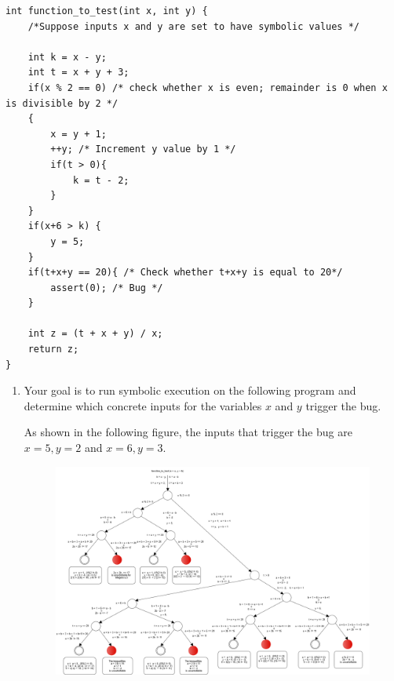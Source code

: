 \documentclass[12pt,a4paper]{article}
\begin{document}
\begin{enumerate}

\begin{lstlisting} 
int function_to_test(int x, int y) {
	/*Suppose inputs x and y are set to have symbolic values */
	
	int k = x - y;
	int t = x + y + 3;
	if(x % 2 == 0) /* check whether x is even; remainder is 0 when x is divisible by 2 */
	{
		x = y + 1;
		++y; /* Increment y value by 1 */
		if(t > 0){
			k = t - 2;
		}
	}	
	if(x+6 > k) {
		y = 5;
	}
	if(t+x+y == 20){ /* Check whether t+x+y is equal to 20*/
		assert(0); /* Bug */
	}
	
	int z = (t + x + y) / x; 
	return z;
}
\end{lstlisting}

\begin{enumerate}
\item Your goal is to run symbolic execution on the following program and determine which concrete inputs for the variables $x$ and $y$ trigger the bug.

\color{blue}

As shown in the following figure, the inputs that trigger the bug are $x=5, y = 2$ and $x = 6, y = 3$.

\begin{figure}[H]
 \centering
 \includegraphics[scale=.30,keepaspectratio=true]{./paths.png}
\end{figure}
\color{black}


\end{enumerate}
\end{enumerate}
\end{document}

